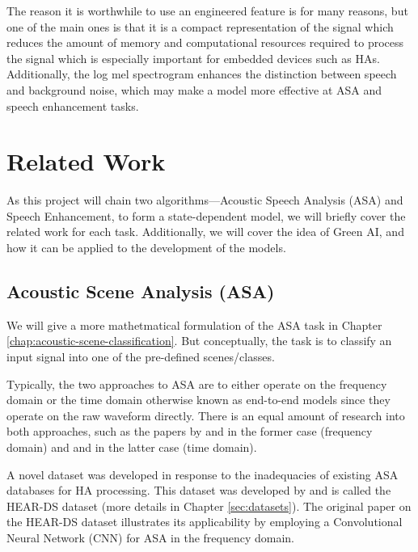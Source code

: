 \documentclass[logo,bsc,singlespacing,parskip,online]{infthesis}
\begin{document}
The reason it is worthwhile to use an engineered feature is for many reasons, but one of the main ones is that 
it is a compact representation of the signal which reduces the amount of memory and computational resources required 
to process the signal which is especially important for embedded devices such as HAs. 
Additionally, the log mel spectrogram enhances the distinction between speech and background noise, which 
may make a model more effective at ASA and speech enhancement tasks.
\section{Related Work}
As this project will chain two algorithms—Acoustic Speech Analysis (ASA) and Speech Enhancement, 
to form a state-dependent model, we will briefly cover the related work for each task.
Additionally, we will cover the idea of Green AI, and how it can be applied to the development of the models.

\subsection{Acoustic Scene Analysis (ASA)}
We will give a more mathetmatical formulation of the ASA task in Chapter \ref{chap:acoustic-scene-classification}. 
But conceptually, the task is to classify an input signal into one of the pre-defined scenes/classes.

Typically, the two approaches to ASA are to either 
operate on the frequency domain or the time domain otherwise known as end-to-end models 
since they operate on the raw waveform directly. 
There is an equal amount of research into both approaches, 
such as the papers by \citet{schindler_multi-temporal_2018} and \citet{kim_specmix_2021} 
in the former case (frequency domain) and \citet{dai_very_2016} 
and \citet{kumar_end_2020} in the latter case (time domain).

A novel dataset was developed in response to the inadequacies of existing ASA databases for HA processing. 
This dataset was developed by \citet{Huwel2020HearDS} and is called the HEAR-DS dataset (more details in Chapter \ref{sec:datasets}).
The original paper on the HEAR-DS dataset illustrates its applicability by employing a Convolutional Neural Network (CNN) for ASA 
in the frequency domain. 
\end{document}
